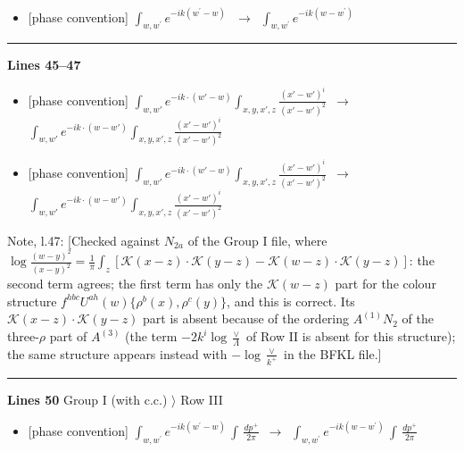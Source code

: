 \documentclass[10pt]{article}
\newenvironment{notebox}{\def\FrameCommand{{\color{notebar}\vrule width 1.5pt}\hspace{6pt}}\MakeFramed{\advance\hsize-\width\FrameRestore}\small}{\endMakeFramed}
\begin{document}
\begin{itemize}[leftmargin=2.2em,itemsep=1pt,topsep=2pt]
\item[\textbf{l.41}] \textsf{\small [phase convention]} $\displaystyle \int_{w, w^\prime} e^{-ik(w^\prime-w)}\,$\ $\longrightarrow$\ $\displaystyle \int_{w, w^\prime} e^{-ik(w-w^\prime)}\,$
\end{itemize}
\noindent\rule{\linewidth}{0.3pt}\par\noindent\textbf{Lines 45--47} \par
\begin{itemize}[leftmargin=2.2em,itemsep=1pt,topsep=2pt]
\item[\textbf{l.45}] \textsf{\small [phase convention]} $\displaystyle \int_{w,w'} e^{-ik\cdot(w'-w)}\int_{x,y,x',z}\frac{(x'-w')^{i}}{(x'-w')^{2}}$\ $\longrightarrow$\ $\displaystyle \int_{w,w'} e^{-ik\cdot(w-w')}\int_{x,y,x',z}\frac{(x'-w')^{i}}{(x'-w')^{2}}$
\item[\textbf{l.46}] \textsf{\small [phase convention]} $\displaystyle \int_{w,w'} e^{-ik\cdot(w'-w)}\int_{x,y,x',z}\frac{(x'-w')^{i}}{(x'-w')^{2}}$\ $\longrightarrow$\ $\displaystyle \int_{w,w'} e^{-ik\cdot(w-w')}\int_{x,y,x',z}\frac{(x'-w')^{i}}{(x'-w')^{2}}$
\end{itemize}
\begin{notebox}\textsf{\small Note, l.47:} [Checked against $N_{2a}$ of the Group I file, where $\log\frac{(w-y)^{2}}{(x-y)^{2}}=\frac{1}{\pi}\int_{z}[\mathcal{K}(x-z)\cdot\mathcal{K}(y-z)-\mathcal{K}(w-z)\cdot\mathcal{K}(y-z)]$: the second term agrees; the first term has only the $\mathcal{K}(w-z)$ part for the colour structure $f^{hbc}U^{ah}(w)\{\rho^{b}(x),\rho^{c}(y)\}$, and this is correct. Its $\mathcal{K}(x-z)\cdot\mathcal{K}(y-z)$ part is absent because of the ordering $A^{(1)}N_{2}$ of the three-$\rho$ part of $A^{(3)}$ (the term $-2k^{i}\log\frac{\vee}{\Lambda}$ of Row II is absent for this structure); the same structure appears instead with $-\log\frac{\vee}{k^{+}}$ in the BFKL file.]\end{notebox}
\noindent\rule{\linewidth}{0.3pt}\par\noindent\textbf{Lines 50} \quad \textsf{Group I (with c.c.) $\rangle$ Row III} \par
\begin{itemize}[leftmargin=2.2em,itemsep=1pt,topsep=2pt]
\item[\textbf{l.50}] \textsf{\small [phase convention]} $\displaystyle \int_{w, w^\prime} e^{-ik(w^\prime-w)}\, \int\,\frac{dp^{+}}{2\pi}$\ $\longrightarrow$\ $\displaystyle \int_{w, w^\prime} e^{-ik(w-w^\prime)}\, \int\,\frac{dp^{+}}{2\pi}$
\end{itemize}
\end{document}
